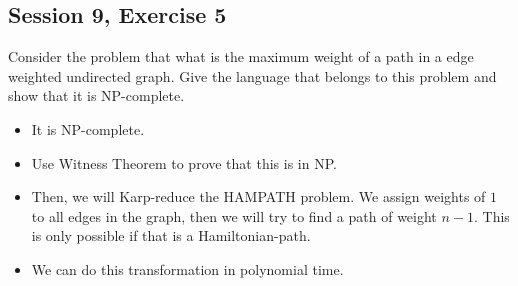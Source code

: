 \subsection {Session 9, Exercise 5}


Consider the problem that what is the maximum weight of a path in a edge weighted undirected graph.
Give the language that belongs to this problem and show that it is NP-complete.


\begin{itemize}
    \item It is NP-complete.
    \item Use Witness Theorem to prove that this is in NP.
    \item Then, we will Karp-reduce the HAMPATH problem. We assign weights of $1$ to all edges in the graph, then we will try to find a path of weight $n-1$. This is only possible if that is a Hamiltonian-path.
    \item We can do this transformation in polynomial time.
\end{itemize}